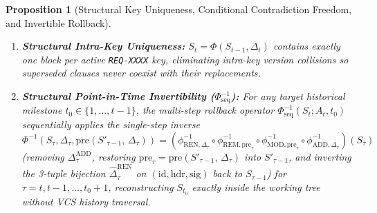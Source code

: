 \documentclass[11pt,a4paper,copyright]{google}
\newtheorem{proposition}{Proposition}
\begin{document}
\begin{proposition}[Structural Key Uniqueness, Conditional Contradiction Freedom, and Invertible Rollback]
\begin{enumerate}[leftmargin=1.5em,itemsep=1pt,topsep=1pt]
  \item \textbf{Structural Intra-Key Uniqueness:} $S_t = \Phi(S_{t-1}, \Delta_t)$ contains exactly one block per active \texttt{REQ-XXXX} key, eliminating intra-key version collisions so superseded clauses never coexist with their replacements.
  \item \textbf{Structural Point-in-Time Invertibility ($\Phi_{\text{seq}}^{-1}$):} For any target historical milestone $t_0 \in \{1, \dots, t-1\}$, the multi-step rollback operator $\Phi_{\text{seq}}^{-1}(S_t; A_t, t_0)$ sequentially applies the single-step inverse $\Phi^{-1}(S_\tau, \Delta_\tau, \text{pre}(S'_{\tau-1},\, \Delta_\tau)) = (\phi_{\text{REN},\Delta_\tau}^{-1} \circ \phi_{\text{REM},\text{pre}_\tau}^{-1} \circ \phi_{\text{MOD},\text{pre}_\tau}^{-1} \circ \phi_{\text{ADD},\Delta_\tau}^{-1})(S_\tau)$ (removing $\Delta_\tau^{\text{ADD}}$, restoring $\text{pre}_\tau = \text{pre}(S'_{\tau-1},\, \Delta_\tau)$ into $S'_{\tau-1}$, and inverting the 3-tuple bijection $\hat{\Delta}_\tau^{\text{REN}}$ on $(\text{id}, \text{hdr}, \text{sig})$ back to $S_{\tau-1}$) for $\tau = t, t-1, \dots, t_0 + 1$, reconstructing $S_{t_0}$ exactly inside the working tree without VCS history traversal.
\end{enumerate}

\end{proposition}
\end{document}
